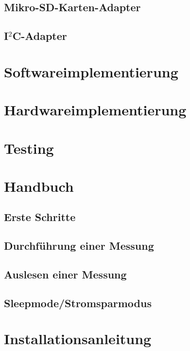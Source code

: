 \documentclass[12pt,			%
a4paper,						%
twoside, 						%
listof=totoc, 					%
bibliography=totoc,				%
titlepage, 						%
headsepline, 					%
DIV18,							%
BCOR6mm,						%
cleardoublepage=empty,			%
parskip,						%
ngerman							%
]{scrbook}
\begin{document}
\section{Mikro-SD-Karten-Adapter}

\section{I$^2$C-Adapter}


\chapter{Softwareimplementierung}


\chapter{Hardwareimplementierung}


\chapter{Testing}


\chapter{Handbuch}

\section{Erste Schritte}

\section{Durchführung einer Messung}

\section{Auslesen einer Messung}

\section{Sleepmode/Stromsparmodus}


\chapter{Installationsanleitung}

\end{document}
